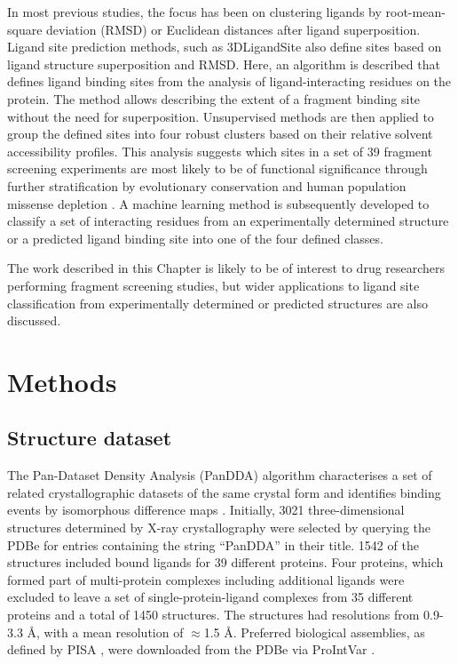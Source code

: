 In most previous studies, the focus has been on clustering ligands by root-mean-square deviation (RMSD) \cite{SHIN_2005_PDBLIGAND} or Euclidean distances \cite{KOZAKOV_2005_CLUSTERING} after ligand superposition. Ligand site prediction methods, such as 3DLigandSite \cite{WASS_2010_3DLIGANDSITE, MCGREIG_2022_3DLIGANDSITE} also define sites based on ligand structure superposition and RMSD. Here, an algorithm is described that defines ligand binding sites from the analysis of ligand-interacting residues on the protein. The method allows describing the extent of a fragment binding site without the need for superposition. Unsupervised methods are then applied to group the defined sites into four robust clusters based on their relative solvent accessibility profiles. This analysis suggests which sites in a set of 39 fragment screening experiments are most likely to be of functional significance through further stratification by evolutionary conservation and human population missense depletion \cite{MACGOWAN_2017_VARIANTS, MACGOWAN_2024_VARIANTS}. A machine learning method is subsequently developed to classify a set of interacting residues from an experimentally determined structure or a predicted ligand binding site into one of the four defined classes.

\newpage

The work described in this Chapter is likely to be of interest to drug researchers performing fragment screening studies, but wider applications to ligand site classification from experimentally determined or predicted structures are also discussed. 

\section{Methods}

\label{sec:ch_FRAGSYS_methods}

\subsection{Structure dataset}

The Pan-Dataset Density Analysis (PanDDA) algorithm characterises a set of related crystallographic datasets of the same crystal form and identifies binding events by isomorphous difference maps \cite{PEARCE_2017_PANDDA}. Initially, 3021 three-dimensional structures determined by X-ray crystallography were selected by querying the PDBe \cite{wwPDB_2019_PDB} for entries containing the string ``PanDDA'' in their title. 1542 of the structures included bound ligands for 39 different proteins. Four proteins, which formed part of multi-protein complexes including additional ligands were excluded to leave a set of single-protein-ligand complexes from 35 different proteins and a total of 1450 structures. The structures had resolutions from 0.9-3.3 \AA{}, with a mean resolution of $\approx$1.5 \AA{}. Preferred biological assemblies, as defined by PISA \cite{KRISSINEL_2007_PISA}, were downloaded from the PDBe via ProIntVar \cite{MACGOWAN_2020_DRSASP}. 

